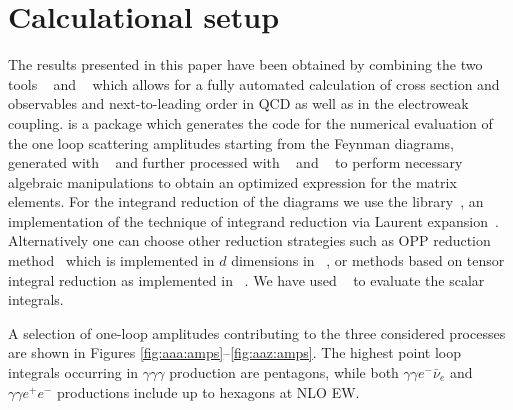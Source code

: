 \section{Calculational setup}
\label{sec:setup}
The results presented in this paper have been obtained by combining the two tools
\GoSam~\cite{Cullen:2011ac,Cullen:2014yla} and \Sherpa~\cite{Gleisberg:2008ta}
which allows for a fully automated calculation of cross section and observables and next-to-leading order in QCD as well
as in the electroweak coupling.
\GoSam is a package which generates the code for the numerical evaluation of
the one loop scattering amplitudes starting from the Feynman diagrams,
generated with \QGraf~\cite{Nogueira:1991ex} and further processed with
\FORM~\cite{Vermaseren:2000nd,Kuipers:2012rf} and
\Spinney~\cite{Cullen:2010jv} to perform necessary algebraic
manipulations to obtain an optimized expression for the matrix elements.
For the integrand reduction of the diagrams we use the \Ninja
library~\cite{Peraro:2014cba}, an implementation of the technique of integrand
reduction via Laurent expansion~\cite{Mastrolia:2012bu,vanDeurzen:2013saa}.
Alternatively one can choose other reduction strategies such as OPP reduction
method~\cite{Ossola:2006us,Mastrolia:2008jb,Ossola:2008xq} which is
implemented in $d$ dimensions in \Samurai~\cite{Mastrolia:2010nb}, or methods based on
tensor integral reduction as implemented in
\GolemNF~\cite{Heinrich:2010ax,Binoth:2008uq,Cullen:2011kv,Guillet:2013msa}.
We have used \OneLoop~\cite{vanHameren:2010cp} to evaluate the scalar integrals.

A selection of one-loop amplitudes contributing to the three 
considered processes are shown in Figures 
\ref{fig:aaa:amps}--\ref{fig:aaz:amps}. 
The highest point loop integrals occurring in $\gamma\gamma\gamma$ 
production are pentagons, while both $\gamma\gamma e^-\bar\nu_e$ 
and $\gamma\gamma e^+e^-$ productions include up to hexagons at 
NLO EW. 

